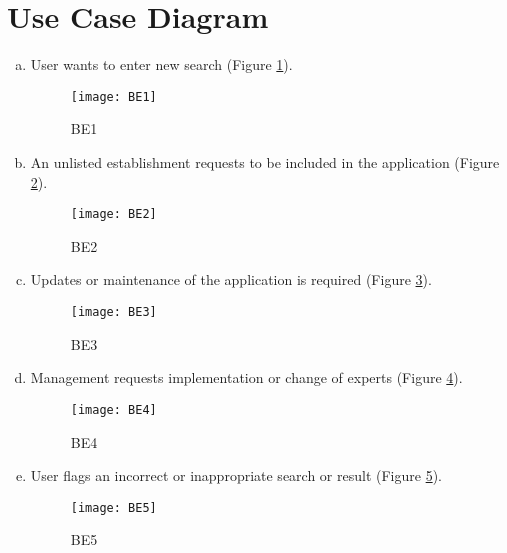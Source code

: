\documentclass[titlepage]{article}
\begin{document}
\section{Use Case Diagram}
\label{sec:use_case_diagram}
\begin{enumerate}[a)]
	\item User wants to enter new search (Figure \ref{usecase:search}).
	
	\begin{center}
		\begin{figure}[H]
			\texttt{[image: BE1]}
			\caption{BE1}\label{usecase:search}
		\end{figure}
	\end{center}

\item An unlisted establishment requests to be included in the application (Figure \ref{usecase:new_esta}).
	
	\begin{center}
		\begin{figure}[H]
			\texttt{[image: BE2]}
			\caption{BE2}\label{usecase:new_esta}
		\end{figure}
	\end{center}

\item Updates or maintenance of the application is required (Figure \ref{usecase:updates}).
	
		\begin{figure}[H]
			\texttt{[image: BE3]}
			\caption{BE3}\label{usecase:updates}
		\end{figure}

\item Management requests implementation or change of experts (Figure \ref{usecase:change_expert}).
	
	\begin{center}
		\begin{figure}[h!]
			\texttt{[image: BE4]}
			\caption{BE4}\label{usecase:change_expert}
		\end{figure}
	\end{center}

\item User flags an incorrect or inappropriate search or result (Figure \ref{usecase:badsearch}).
	
	\begin{center}
		\begin{figure}[H]
			\texttt{[image: BE5]}
			\caption{BE5}\label{usecase:badsearch}
		\end{figure}
	\end{center}
	
	\end{enumerate}
\end{document}
